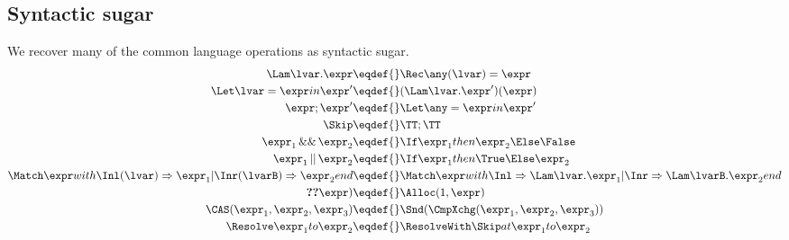 \subsection{Syntactic sugar}

We recover many of the common language operations as syntactic sugar.
\begin{align*}
  \Lam \lvar. \expr \eqdef{}& \Rec\any(\lvar)= \expr \\
  \Let \lvar = \expr in \expr' \eqdef{}& (\Lam \lvar. \expr')(\expr) \\
  \expr; \expr' \eqdef{}& \Let \any = \expr in \expr' \\
  \Skip \eqdef{}& \TT; \TT \\
  \expr_1 \mathop{\&\&} \expr_2 \eqdef{}& \If \expr_1 then \expr_2 \Else \False \\
  \expr_1 \mathop{||} \expr_2 \eqdef{}& \If \expr_1 then \True \Else \expr_2 \\
  \Match \expr with \Inl(\lvar) => \expr_1 | \Inr(\lvarB) => \expr_2 end \eqdef {}&
    \Match \expr with \Inl => \Lam\lvar. \expr_1 | \Inr => \Lam\lvarB. \expr_2 end \\
  \Ref(\expr) \eqdef{}& \Alloc(1,\expr) \\
  \CAS(\expr_1, \expr_2, \expr_3) \eqdef{}& \Snd(\CmpXchg(\expr_1, \expr_2, \expr_3)) \\
  \Resolve \expr_1 to \expr_2 \eqdef{}& \ResolveWith \Skip at \expr_1 to \expr_2
\end{align*}

